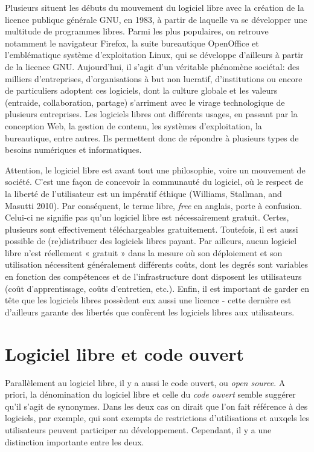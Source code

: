 \documentclass[
  letterpaper,
]{scrbook}
\begin{document}
Plusieurs situent les débuts du mouvement du logiciel libre avec la
création de la licence publique générale GNU, en 1983, à partir de
laquelle va se développer une multitude de programmes libres. Parmi les
plus populaires, on retrouve notamment le navigateur Firefox, la suite
bureautique OpenOffice et l'emblématique système d'exploitation Linux,
qui se développe d'ailleurs à partir de la licence GNU. Aujourd'hui, il
s'agit d'un véritable phénomène sociétal: des milliers d'entreprises,
d'organisations à but non lucratif, d'institutions ou encore de
particuliers adoptent ces logiciels, dont la culture globale et les
valeurs (entraide, collaboration, partage) s'arriment avec le virage
technologique de plusieurs entreprises. Les logiciels libres ont
différents usages, en passant par la conception Web, la gestion de
contenu, les systèmes d'exploitation, la bureautique, entre autres. Ils
permettent donc de répondre à plusieurs types de besoins numériques et
informatiques.

Attention, le logiciel libre est avant tout une philosophie, voire un
mouvement de société. C'est une façon de concevoir la communauté du
logiciel, où le respect de la liberté de l'utilisateur est un impératif
éthique (Williams, Stallman, and Masutti 2010). Par conséquent, le terme
libre, \emph{free} en anglais, porte à confusion. Celui-ci ne signifie
pas qu'un logiciel libre est nécessairement gratuit. Certes, plusieurs
sont effectivement téléchargeables gratuitement. Toutefois, il est aussi
possible de (re)distribuer des logiciels libres payant. Par ailleurs,
aucun logiciel libre n'est réellement « gratuit » dans la mesure où son
déploiement et son utilisation nécessitent généralement différents
coûts, dont les degrés sont variables en fonction des compétences et de
l'infrastructure dont disposent les utilisateurs (coût d'apprentissage,
coûts d'entretien, etc.). Enfin, il est important de garder en tête que
les logiciels libres possèdent eux aussi une licence - cette dernière
est d'ailleurs garante des libertés que confèrent les logiciels libres
aux utilisateurs.

\hypertarget{logiciel-libre-et-code-ouvert}{%
\section{Logiciel libre et code
ouvert}\label{logiciel-libre-et-code-ouvert}}

Parallèlement au logiciel libre, il y a aussi le code ouvert, ou
\emph{open source}. A priori, la dénomination du logiciel libre et celle
du \emph{code ouvert} semble suggérer qu'il s'agit de synonymes. Dans
les deux cas on dirait que l'on fait référence à des logiciels, par
exemple, qui sont exempts de restrictions d'utilisations et auxqels les
utilisateurs peuvent participer au développement. Cependant, il y a une
distinction importante entre les deux.
\end{document}

